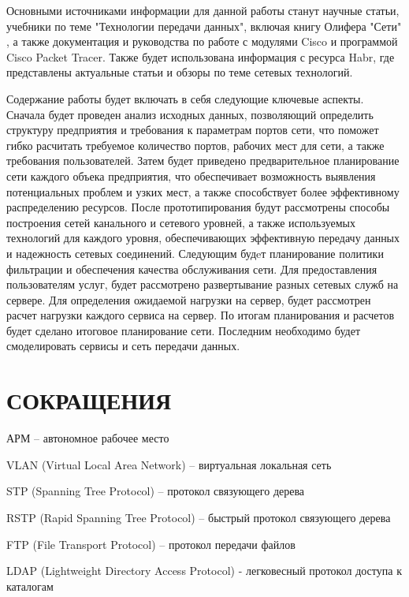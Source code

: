 \documentclass[14pt, a4paper]{extarticle}
\numberwithin{equation}{section}
\begin{document}
Основными источниками информации 
для данной работы станут научные статьи, 
учебники по теме "Технологии передачи данных", 
включая книгу Олифера "Сети" \cite{olifer}, 
а также документация и руководства по работе 
с модулями Cisco и программой 
Cisco Packet Tracer. Также будет использована 
информация с ресурса Habr, 
где представлены актуальные статьи и обзоры 
по теме сетевых технологий.

Содержание работы будет включать в себя следующие ключевые аспекты. 
Сначала будет проведен анализ исходных данных, позволяющий определить структуру предприятия и 
требования к параметрам портов сети, что поможет гибко расчитать требуемое количество портов, 
рабочих мест для сети, а также требования пользователей. 
Затем будет приведено предварительное планирование сети каждого объека предприятия, что 
обеспечивает возможность выявления потенциальных проблем и узких мест, 
а также способствует более эффективному распределению ресурсов. 
После прототипирования будут рассмотрены способы построения сетей канального и сетевого уровней,
а также используемых технологий для каждого уровня, обеспечивающих эффективную передачу данных и надежность сетевых соединений.
Следующим будeт планирование политики фильтрации и обеспечения качества обслуживания сети.
Для предоставления пользователям услуг, будет рассмотрено развертывание разных сетевых служб на сервере.
Для определения ожидаемой нагрузки на сервер, будет рассмотрен расчет нагрузки каждого сервиса на сервер.
По итогам планирования и расчетов будет сделано итоговое планирование сети.
Последним необходимо будет смоделировать сервисы и сеть передачи данных.



\section*{СОКРАЩЕНИЯ}
АРМ – автономное рабочее место

VLAN (Virtual Local Area Network) – виртуальная локальная сеть

STP (Spanning Tree Protocol) – протокол связующего дерева

RSTP (Rapid Spanning Tree Protocol) – быстрый протокол связующего дерева

FTP (File Transport Protocol) – протокол передачи файлов

LDAP (Lightweight Directory Access Protocol) - легковесный протокол доступа к
каталогам
\end{document}
